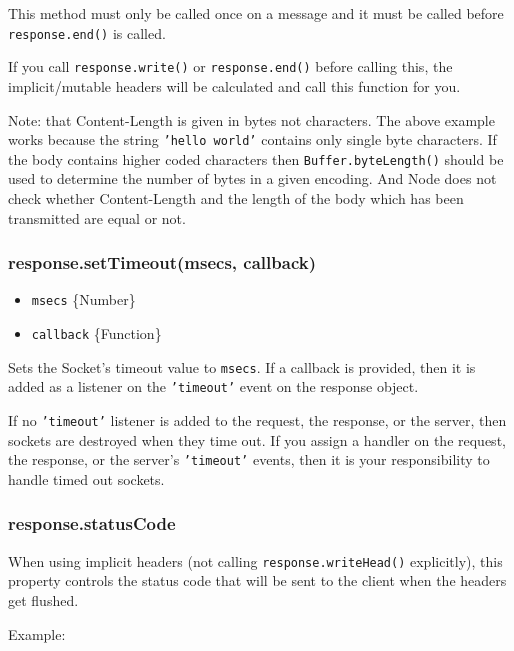 This method must only be called once on a message and it must be called
before \texttt{response.end()} is called.

If you call \texttt{response.write()} or \texttt{response.end()} before
calling this, the implicit/mutable headers will be calculated and call
this function for you.

Note: that Content-Length is given in bytes not characters. The above
example works because the string \texttt{'hello world'} contains only
single byte characters. If the body contains higher coded characters
then \texttt{Buffer.byteLength()} should be used to determine the number
of bytes in a given encoding. And Node does not check whether
Content-Length and the length of the body which has been transmitted are
equal or not.

\subsubsection{response.setTimeout(msecs, callback)}

\begin{itemize}
\item
  \texttt{msecs} \{Number\}
\item
  \texttt{callback} \{Function\}
\end{itemize}

Sets the Socket's timeout value to \texttt{msecs}. If a callback is
provided, then it is added as a listener on the \texttt{'timeout'} event
on the response object.

If no \texttt{'timeout'} listener is added to the request, the response,
or the server, then sockets are destroyed when they time out. If you
assign a handler on the request, the response, or the server's
\texttt{'timeout'} events, then it is your responsibility to handle
timed out sockets.

\subsubsection{response.statusCode}

When using implicit headers (not calling \texttt{response.writeHead()}
explicitly), this property controls the status code that will be sent to
the client when the headers get flushed.

Example:

\begin{Shaded}
\begin{Highlighting}[]
 \NormalTok{= }\NormalTok{;}
\end{Highlighting}
\end{Shaded}


